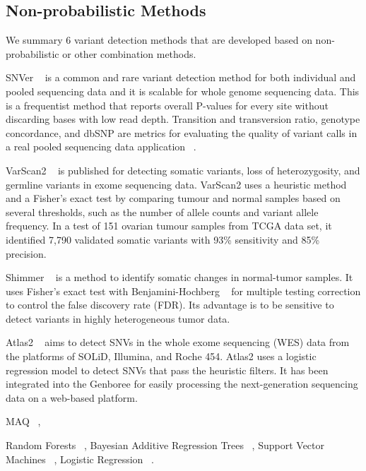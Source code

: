\documentclass[11pt,reqno]{amsart}
\begin{document}
\subsection{Non-probabilistic Methods}
We summary 6 variant detection methods that are developed based on non-probabilistic or other combination methods.

SNVer ~\citep{Wei2011} is a common and rare variant detection method for both individual and pooled sequencing data and it is scalable for whole genome sequencing data.
This is a frequentist method that reports overall P-values for every site without discarding bases with low read depth.
Transition and transversion ratio, genotype concordance, and dbSNP are metrics for evaluating the quality of variant calls in a real pooled sequencing data application ~\citep{depristo2011framework}.

VarScan2 ~\citep{Koboldt2012} is published for detecting somatic variants, loss of heterozygosity, and germline variants in exome sequencing data.
VarScan2 uses a heuristic method and a Fisher's exact test by comparing tumour and normal samples based on several thresholds, such as the number of allele counts and variant allele frequency.
In a test of 151 ovarian tumour samples from TCGA data set, it identified 7,790 validated somatic variants with 93\% sensitivity and 85\% precision.

Shimmer ~\citep{Hansen2013} is a method to identify somatic changes in normal-tumor samples.
It uses Fisher's exact test with Benjamini-Hochberg ~\citep{benjamini1995controlling} for multiple testing correction to control the false discovery rate (FDR).
Its advantage is to be sensitive to detect variants in highly heterogeneous tumor data.

Atlas2 ~\citep{challis2012integrative} aims to detect SNVs in the whole exome sequencing (WES) data from the platforms of SOLiD, Illumina, and Roche 454.
Atlas2 uses a logistic regression model to detect SNVs that pass the heuristic filters.
It has been integrated into the Genboree for easily processing the next-generation sequencing data on a web-based platform.

MAQ ~\citep{Li2008},

Random Forests ~\citep{Ding2012},
Bayesian Additive Regression Trees ~\citep{Ding2012},
Support Vector Machines ~\citep{Ding2012},
Logistic Regression ~\citep{Ding2012}.




\end{document}
